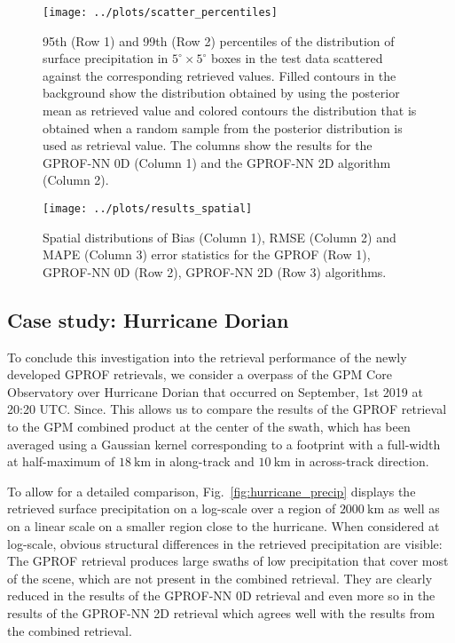 \documentclass[a4paper,11pt,bibtotoc]{scrartcl}
\begin{document}
  \begin{figure}[hbpt]
    \centering
    \texttt{[image: ../plots/scatter\_percentiles]}
    \caption{
      95th (Row 1) and 99th (Row 2) percentiles of the distribution
      of surface precipitation in $5^\circ \times 5^\circ$ boxes in the
      test data scattered against the corresponding retrieved values. Filled
      contours in the background show the distribution obtained by using the
      posterior mean as retrieved value and colored contours the distribution
      that is obtained when a random sample from the posterior distribution
      is used as retrieval value. The columns show the results for the
      GPROF-NN 0D (Column 1) and the GPROF-NN 2D algorithm  (Column 2).
    }
    \label{fig:scatter_percentiles}
  \end{figure}

\begin{figure}[hbpt]
  \centering
  \texttt{[image: ../plots/results\_spatial]}
  \caption{
    Spatial distributions of Bias (Column 1), RMSE (Column 2) and MAPE (Column 3) error statistics for the
    GPROF (Row 1), GPROF-NN 0D (Row 2), GPROF-NN 2D (Row 3) algorithms.
  }
    \label{fig:results_spatial}
\end{figure}


\subsection{Case study: Hurricane Dorian}

To conclude this investigation into the retrieval performance of the newly
developed GPROF retrievals, we consider a overpass of the GPM Core Observatory
over Hurricane Dorian that occurred on September, 1st 2019 at 20:20 UTC.
Since. This allows us to compare the results of the GPROF retrieval to the
GPM combined product at the center of the swath, which has been averaged using
a Gaussian kernel corresponding to a footprint with a full-width at half-maximum
of $\SI{18}{\kilo \meter}$ in along-track and $\SI{10}{\kilo \meter}$ in
across-track direction.

To allow for a detailed comparison, Fig.~\ref{fig:hurricane_precip} displays the
retrieved surface precipitation on a log-scale over a region of $\SI{2000}{\kilo
  \meter}$ as well as on a linear scale on a smaller region close to the
hurricane. When considered at log-scale, obvious structural differences in the
retrieved precipitation are visible: The GPROF retrieval produces large swaths
of low precipitation that cover most of the scene, which are not present in the
combined retrieval. They are clearly reduced in the results of the GPROF-NN 0D
retrieval and even more so in the results of the GPROF-NN 2D retrieval which
agrees well with the results from the combined retrieval.
\end{document}
